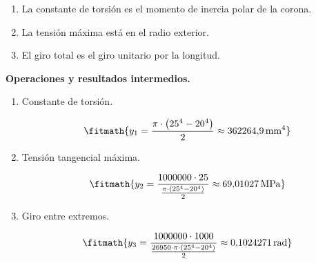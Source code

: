 \begin{enumerate}

\item La constante de torsión es el momento de inercia polar de la corona.

\item La tensión máxima está en el radio exterior.

\item El giro total es el giro unitario por la longitud.

\end{enumerate}

\noindent\textbf{Operaciones y resultados intermedios.}

\begin{enumerate}

\item Constante de torsión.

\[\fitmath{y_{1}=\frac{\pi\cdot \left({25}^{4}-{20}^{4}\right)}{2}\approx 362264{,}9\,\mathrm{mm^{4}}}\]

\item Tensión tangencial máxima.

\[\fitmath{y_{2}=\frac{1000000\cdot 25}{\frac{\pi\cdot \left({25}^{4}-{20}^{4}\right)}{2}}\approx 69{,}01027\,\mathrm{MPa}}\]

\item Giro entre extremos.

\[\fitmath{y_{3}=\frac{1000000\cdot 1000}{\frac{26950\cdot \pi\cdot \left({25}^{4}-{20}^{4}\right)}{2}}\approx 0{,}1024271\,\mathrm{rad}}\]

\end{enumerate}
